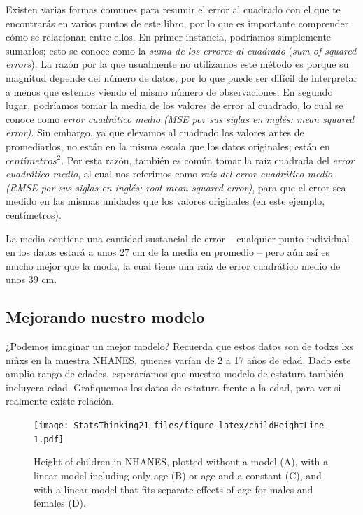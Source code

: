 \documentclass[
  12pt,
]{book}
\begin{document}
Existen varias formas comunes para resumir el error al cuadrado con el que te encontrarás en varios puntos de este libro, por lo que es importante comprender cómo se relacionan entre ellos. En primer instancia, podríamos simplemente sumarlos; esto se conoce como la \emph{suma de los errores al cuadrado} (\emph{sum of squared errors}). La razón por la que usualmente no utilizamos este método es porque su magnitud depende del número de datos, por lo que puede ser difícil de interpretar a menos que estemos viendo el mismo número de observaciones. En segundo lugar, podríamos tomar la media de los valores de error al cuadrado, lo cual se conoce como \emph{error cuadrático medio (MSE por sus siglas en inglés: mean squared error)}. Sin embargo, ya que elevamos al cuadrado los valores antes de promediarlos, no están en la misma escala que los datos originales; están en \(centímetros^2\). Por esta razón, también es común tomar la raíz cuadrada del \emph{error cuadrático medio}, al cual nos referimos como \emph{raíz del error cuadrático medio (RMSE por sus siglas en inglés: root mean squared error)}, para que el error sea medido en las mismas unidades que los valores originales (en este ejemplo, centímetros).

La media contiene una cantidad sustancial de error -- cualquier punto individual en los datos estará a unos 27 cm de la media en promedio -- pero aún así es mucho mejor que la moda, la cual tiene una raíz de error cuadrático medio de unos 39 cm.

\hypertarget{mejorando-nuestro-modelo}{%
\subsection{Mejorando nuestro modelo}\label{mejorando-nuestro-modelo}}

¿Podemos imaginar un mejor modelo? Recuerda que estos datos son de todxs lxs niñxs en la muestra NHANES, quienes varían de 2 a 17 años de edad. Dado este amplio rango de edades, esperaríamos que nuestro modelo de estatura también incluyera edad. Grafiquemos los datos de estatura frente a la edad, para ver si realmente existe relación.

\begin{figure}
\centering
\texttt{[image: StatsThinking21\_files/figure-latex/childHeightLine-1.pdf]}
\caption{\label{fig:childHeightLine}Height of children in NHANES, plotted without a model (A), with a linear model including only age (B) or age and a constant (C), and with a linear model that fits separate effects of age for males and females (D).}
\end{figure}
\end{document}
